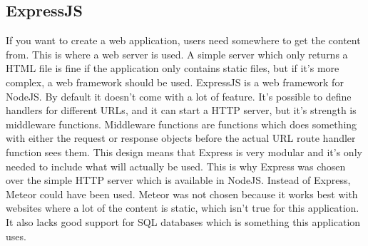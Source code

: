 \subsection{ExpressJS}
If you want to create a web application, users need somewhere to get the content from. This is where a web server is used. A simple server which only returns a HTML file is fine if the application only contains static files, but if it's more complex, a web framework should be used. ExpressJS is a web framework for NodeJS. By default it doesn't come with a lot of feature. It's possible to define handlers for different URLs, and it can start a HTTP server, but it's strength is middleware functions. Middleware functions are functions which does something with either the request or response objects before the actual URL route handler function sees them. This design means that Express is very modular and it's only needed to include what will actually be used. This is why Express was chosen over the simple HTTP server which is available in NodeJS. Instead of Express, Meteor could have been used. Meteor was not chosen because it works best with websites where a lot of the content is static, which isn't true for this application. It also lacks good support for SQL databases which is something this application uses.

